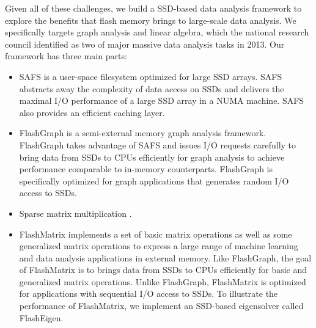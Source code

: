 Given all of these challenges, we build a SSD-based data analysis framework
to explore the benefits that flash memory brings to large-scale data analysis.
We specifically targets graph analysis and linear
algebra, which the national research council identified as two of major massive
data analysis tasks \cite{} in 2013. Our framework has three main parts:
\begin{itemize}
	\item SAFS \cite{safs} is a user-space filesystem optimized for large SSD
		arrays. SAFS abstracts away the complexity of data access on SSDs and
		delivers the maximal I/O performance of a large SSD array in a NUMA
		machine. SAFS also provides an efficient caching layer. 
	\item FlashGraph \cite{flashgraph} is a semi-external memory graph analysis
		framework. FlashGraph takes advantage of SAFS and issues I/O requests
		carefully to bring data from SSDs to CPUs efficiently for graph analysis
		to achieve performance comparable to in-memory counterparts. FlashGraph
		is specifically optimized for graph applications that generates random
		I/O access to SSDs.
	\item Sparse matrix multiplication \cite{spmm}.
	\item FlashMatrix \cite{flashmatrix} implements a set of basic matrix
		operations as well as some generalized matrix operations to
		express a large range of machine learning and data analysis applications
		in external memory. Like FlashGraph, the goal of FlashMatrix is to brings
		data from SSDs to CPUs efficiently for basic and generalized matrix
		operations. Unlike FlashGraph, FlashMatrix is optimized for applications
		with sequential I/O access to SSDs. To illustrate the performance of
		FlashMatrix, we implement an SSD-based eigensolver called FlashEigen.
\end{itemize}

\makeatletter
\let\@currsize\normalsize
\makeatother
